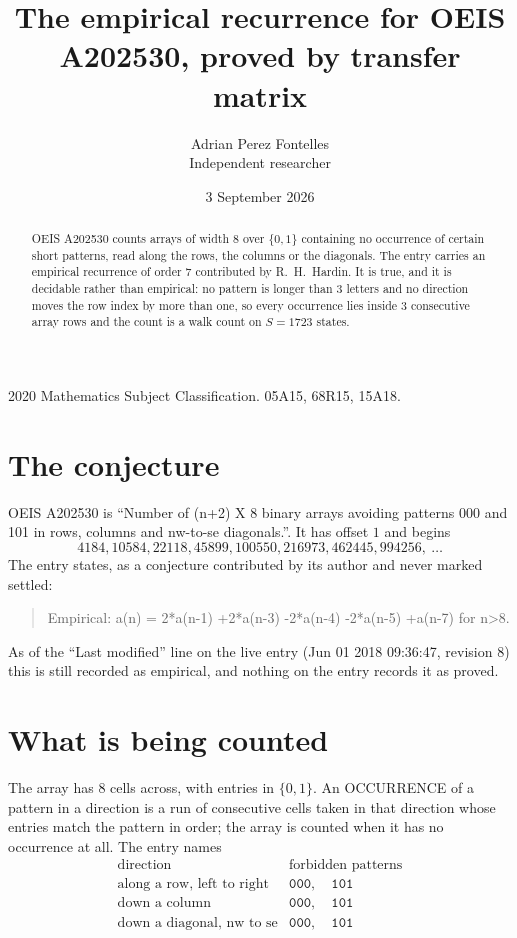 \documentclass[11pt,a4paper]{article}
\title{The empirical recurrence for OEIS A202530, proved by transfer matrix}
\author{Adrian Perez Fontelles\\ \small Independent researcher}
\date{3 September 2026}
\theoremstyle{plain}
\theoremstyle{definition}
\begin{document}
\maketitle

\begin{abstract}
OEIS A202530 counts arrays of width $8$ over $\{0,1\}$ containing no occurrence of certain short
patterns, read along the rows, the columns or the diagonals. The entry carries an empirical
recurrence of order $7$ contributed by R.~H.~Hardin. It is true, and it is decidable
rather than empirical: no pattern is longer than $3$ letters and no direction moves the row
index by more than one, so every occurrence lies inside $3$ consecutive array rows and the
count is a walk count on $S=1723$ states.
\end{abstract}

\noindent\small 2020 Mathematics Subject Classification. 05A15, 68R15, 15A18.\normalsize

\section{The conjecture}

OEIS A202530 is ``Number of (n+2) X 8 binary arrays avoiding patterns 000 and 101 in rows, columns and nw-to-se diagonals.''. It has offset $1$ and begins
\[
4184, 10584, 22118, 45899, 100550, 216973, 462445, 994256,\ \dots
\]
The entry states, as a conjecture contributed by its author and never marked settled:
\begin{quote}
Empirical: a(n) = 2*a(n-1) +2*a(n-3) -2*a(n-4) -2*a(n-5) +a(n-7) for n>8.
\end{quote}
As of the ``Last modified'' line on the live entry (Jun 01 2018 09:36:47, revision 8) this is still
recorded as empirical, and nothing on the entry records it as proved.

\section{What is being counted}

The array has $8$ cells across, with entries in $\{0,1\}$. An OCCURRENCE of a pattern in a
direction is a run of consecutive cells taken in that direction whose entries match the pattern
in order; the array is counted when it has no occurrence at all. The entry names
\[
\begin{array}{ll}
\text{direction} & \text{forbidden patterns} \\[2pt]
\text{along a row, left to right} & \mathtt{000},\quad \mathtt{101} \\
\text{down a column} & \mathtt{000},\quad \mathtt{101} \\
\text{down a diagonal, nw to se} & \mathtt{000},\quad \mathtt{101} \\
\end{array}
\]
\end{document}
